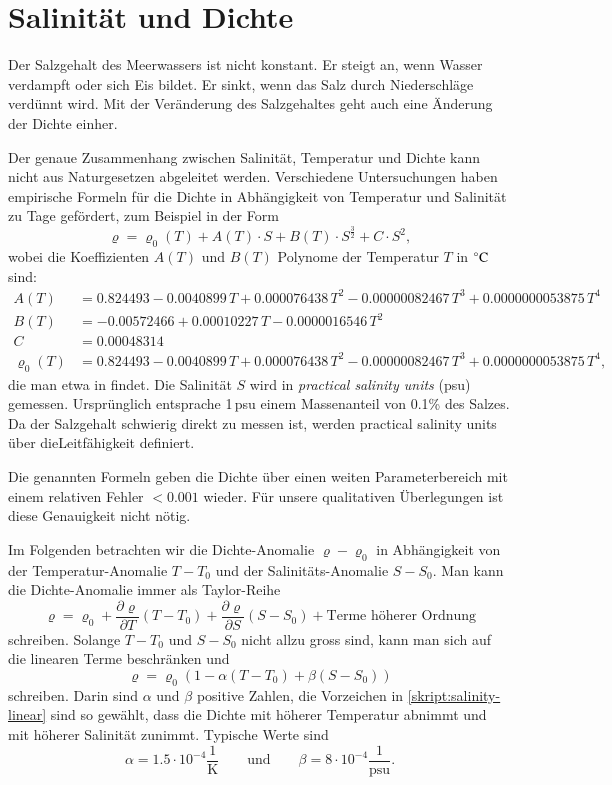 %
%
%
\section{Salinität und Dichte}
Der Salzgehalt des Meerwassers ist nicht konstant.
Er steigt an, wenn Wasser verdampft oder sich Eis bildet.
Er sinkt, wenn das Salz durch Niederschläge verdünnt wird.
Mit der Veränderung des Salzgehaltes geht auch eine Änderung
der Dichte einher.

Der genaue Zusammenhang zwischen Salinität, Temperatur und Dichte
kann nicht aus Naturgesetzen abgeleitet werden.
Verschiedene Untersuchungen haben empirische Formeln für die
Dichte in Abhängigkeit von Temperatur und Salinität zu Tage
gefördert,
zum Beispiel in der Form
\[
\varrho
=
\varrho_0(T)
+
A(T)\cdot S + B(T)\cdot S^{\frac32}+C\cdot S^2,
\]
wobei die Koeffizienten $A(T)$ und $B(T)$ Polynome der Temperatur $T$ in
$\mathstrut^\circ\text{C}$ sind:
\begin{align*}
A(T)
&=
 0.824493 - 0.0040899\,T + 0.000076438\,T^2 - 0.00000082467\,T^3 + 0.0000000053875\,T^4
\\
B(T)
&=
 -0.00572466 + 0.00010227\,T - 0.0000016546\,T^2
\\
C
&=
0.00048314
\\
\varrho_0(T)
&=
 0.824493 - 0.0040899\,T + 0.000076438\,T^2
 - 0.00000082467\,T^3 + 0.0000000053875\,T^4,
\end{align*}
die man etwa in
\cite{skript:millero}
findet.
Die Salinität $S$ wird in {\em practical salinity units} (psu) gemessen.
Ursprünglich entsprache 1\,psu einem Massenanteil von 0.1\%
des Salzes. 
Da der Salzgehalt schwierig direkt zu messen ist, werden practical salinity
units über dieLeitfähigkeit definiert.
%
%

Die genannten Formeln geben die Dichte über einen weiten Parameterbereich
mit einem relativen Fehler $<0.001$ wieder.
Für unsere qualitativen Überlegungen ist diese Genauigkeit
nicht nötig.

Im Folgenden betrachten wir die Dichte-Anomalie $\varrho-\varrho_0$
in Abhängigkeit von der Temperatur-Anomalie $T-T_0$ und der
Salinitäts-Anomalie $S-S_0$.
Man kann die Dichte-Anomalie immer als Taylor-Reihe
\[
\varrho 
=
\varrho_0
+
\frac{\partial \varrho}{\partial T}(T-T_0)
+
\frac{\partial \varrho}{\partial S}(S-S_0)
+
\text{Terme höherer Ordnung}
\]
schreiben.
Solange $T-T_0$ und $S-S_0$ nicht allzu gross sind, kann man sich auf
die linearen Terme beschränken und
\begin{equation}
\varrho
=
\varrho_0(1-\alpha(T-T_0)+\beta(S-S_0))
\label{skript:salinity-linear}
\end{equation}
schreiben.
Darin sind $\alpha$ und $\beta$ positive Zahlen, die Vorzeichen in
\eqref{skript:salinity-linear} sind so gewählt, dass die Dichte
mit höherer Temperatur abnimmt und mit höherer Salinität zunimmt.
Typische Werte sind
\[
\alpha = 1.5\cdot 10^{-4}\frac{1}{\text{K}}
\qquad
\text{und}
\qquad
\beta = 8\cdot 10^{-4}\frac{1}{\text{psu}}.
\]

